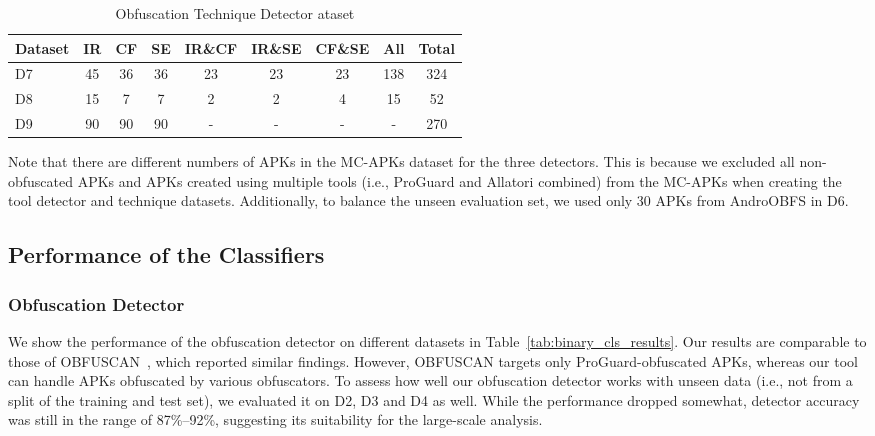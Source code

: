 \begin{table}[!h] 
    \caption{Obfuscation Technique Detector ataset}
    \label{tab:technique_detection_dataset}
    \begin{tabular}{p{0.8cm}cccccccc} \hline
        Dataset & IR & CF & SE & IR\&CF & IR\&SE & CF\&SE & All & \textbf{Total}\\
        \hline
        D7 & 45 & 36 & 36 & 23 & 23 & 23 & 138 & 324\\
        D8 & 15 & 7 & 7 & 2 & 2 & 4 & 15 & 52\\
        D9 & 90 & 90 & 90 & - & - & - & - & 270\\
        \hline
    \end{tabular}
\end{table}

Note that there are different numbers of APKs in the MC-APKs dataset for the three detectors. This is because we excluded all non-obfuscated APKs and APKs created using multiple tools (i.e., ProGuard and Allatori combined) from the MC-APKs when creating the tool detector and technique datasets. Additionally, to balance the unseen evaluation set, we used only 30 APKs from AndroOBFS in D6. 


\subsection{Performance of the Classifiers}
\label{sec:training_and_validation}

\subsubsection{{Obfuscation Detector}}

We show the performance of the obfuscation detector on different datasets in Table~\ref{tab:binary_cls_results}. Our results are comparable to those of OBFUSCAN~\cite{wermke2018large}, which reported similar findings. However, OBFUSCAN targets only ProGuard-obfuscated APKs, whereas our tool can handle APKs obfuscated by various obfuscators. To assess how well our obfuscation detector works with unseen data (i.e., not from a split of the training and test set), we evaluated it on D2, D3 and D4 as well. While the performance dropped somewhat, detector accuracy was still in the range of 87\%--92\%, suggesting its suitability for the large-scale analysis.


\begin{table}[h]
\caption{Obfuscation detection - Results}
\label{tab:binary_cls_results}
\end{table}

